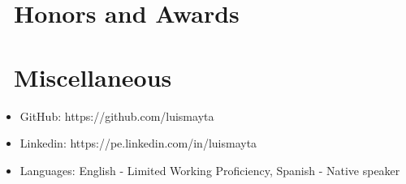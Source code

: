 \documentclass{resume}
\begin{document}
\section{\faHeartO\ Honors and Awards}

\section{\faInfo\ Miscellaneous}
\begin{itemize}[parsep=0.5ex]
  \item GitHub: https://github.com/luismayta
  \item Linkedin: https://pe.linkedin.com/in/luismayta
  \item Languages: English - Limited Working Proficiency, Spanish - Native speaker
\end{itemize}

%
%
\end{document}
